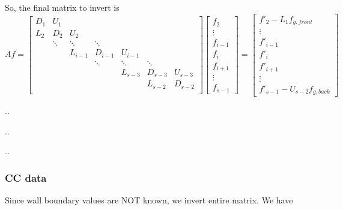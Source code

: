 \documentclass[11pt]{article}
\begin{document}
So, the final matrix to invert is
\[ Af = \left[
\begin{array}{ccccccccc}
D_{1} & U_{1}    &           &           &           &           &         \\
L_{2} & D_{2}    & U_{2}     &           &           &           &         \\
      & \ddots   & \ddots    & \ddots    &           &           &         \\
      &          & L_{i-1}   & D_{i-1}   & U_{i-1}   &           &         \\
      &          &           & \ddots    & \ddots    & \ddots    &         \\
      &          &           &           & L_{s-3}   & D_{s-3}   & U_{s-3} \\
      &          &           &           &           & L_{s-2}   & D_{s-2} \\
\end{array} \right]
\left[ \begin{array}{c}
f_{2} \\ \vdots \\ f_{i-1} \\ f_{i} \\ f_{i+1} \\ \vdots \\ f_{s-1}
\end{array} \right]
=
\left[ \begin{array}{c}
f'_{2} - L_1 f_{g,front} \\ \vdots \\
f'_{i-1} \\ f'_{i} \\ f'_{i+1} \\ \vdots \\ f'_{s-1} - U_{s-2} f_{g,back}
\end{array} \right]
\]

..

..

..

\subsubsection{CC data}

Since wall boundary values are NOT known, we invert entire matrix. We have
\end{document}
